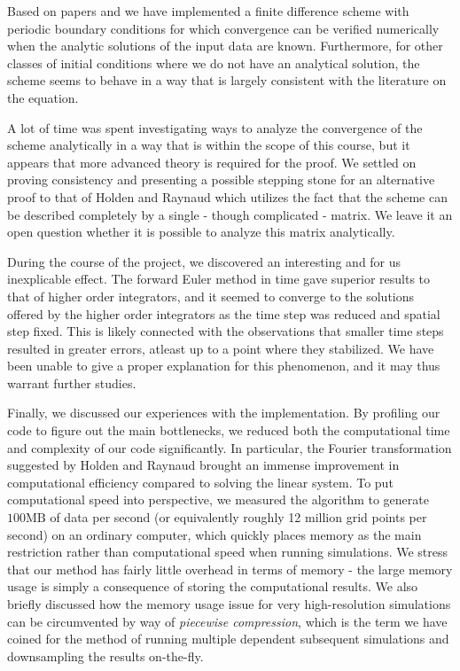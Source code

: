 Based on papers \cite{holden2006convergence} and \cite{dahlby2007geometric} we have implemented a finite difference scheme with periodic boundary conditions for which convergence can be verified numerically when the analytic solutions of the input data are known. Furthermore, for other classes of initial conditions where we do not have an analytical solution, the scheme seems to behave in a way that is largely consistent with the literature on the equation. 

A lot of time was spent investigating ways to analyze the convergence of the scheme analytically in a way that is within the scope of this course, but it appears that more advanced theory is required for the proof. We settled on proving consistency and presenting a possible stepping stone for an alternative proof to that of Holden and Raynaud which utilizes the fact that the scheme can be described completely by a single - though complicated - matrix. We leave it an open question whether it is possible to analyze this matrix analytically. 

During the course of the project, we discovered an interesting and for us inexplicable effect. The forward Euler method in time gave superior results to that of higher order integrators, and it seemed to converge to the solutions offered by the higher order integrators as the time step was reduced and spatial step fixed. This is likely connected with the observations that smaller time steps resulted in greater errors, atleast up to a point where they stabilized. We have been unable to give a proper explanation for this phenomenon, and it may thus warrant further studies.

Finally, we discussed our experiences with the implementation. By profiling our code to figure out the main bottlenecks, we reduced both the computational time and complexity of our code significantly. In particular, the Fourier transformation suggested by Holden and Raynaud brought an immense improvement in computational efficiency compared to solving the linear system. To put computational speed into perspective, we measured the algorithm to generate $100 \text{MB}$ of data per second (or equivalently roughly 12 million grid points per second) on an ordinary computer, which quickly places memory as the main restriction rather than computational speed when running simulations. We stress that our method has fairly little overhead in terms of memory - the large memory usage is simply a consequence of storing the computational results. We also briefly discussed how the memory usage issue for very high-resolution simulations can be circumvented by way of \emph{piecewise compression}, which is the term we have coined for the method of running multiple dependent subsequent simulations and downsampling the results on-the-fly.

